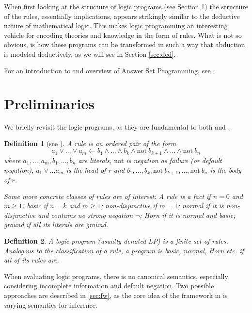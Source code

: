 \documentclass[a4paper]{article}
\newcommand{\fail}{\mathrm{not } \ \xspace}
\newcommand{\from}{\ensuremath{\leftarrow}}
\newtheorem{definition}{Definition}
\begin{document}
When first looking at the structure of logic programs (see Section \ref{sec:prelim}) the structure of the rules, essentially implications, appears strikingly similar to the deductive nature of mathematical logic. This makes logic programming an interesting vehicle for encoding theories and knowledge in the form of rules. What is not so obvious, is how these programs can be transformed in such a way that abduction is modeled deductively, as we will see in Section \ref{sec:ded}.

For an introduction to and overview of Answer Set Programming, see \cite{DBLP:conf/rweb/EiterIK09}.

\section{Preliminaries}
\label{sec:prelim}

We briefly revisit the logic programs, as they are fundamental to both \citep{DBLP:journals/logcom/ConsoleDT91} and \cite{DBLP:journals/tcs/EiterGL97}.

\begin{definition}[{see \cite[Slide 15]{ewbs}}]
	A \emph{rule} is an ordered pair of the form $$a_1 \vee \ldots \vee a_m \from b_1 \wedge \ldots \wedge b_k \wedge \fail b_{k+1} \wedge \ldots \wedge \fail b_n$$ where $a_1, \ldots, a_m, b_1, \ldots, b_n$ are literals, $\mathrm{not}$ is \emph{negation as failure} (or \emph{default negation}), $a_1 \vee \ldots a_m$ is the \emph{head} of $r$ and $b_1, \ldots, b_k, \fail b_{k+1}, \ldots, \fail b_n$ is the \emph{body} of $r$.
	
	Some more concrete classes of rules are of interest: A rule is a \emph{fact} if $n = 0$ and $m \geq 1$; \emph{basic} if $n = k$ and $m \geq 1$; \emph{non-disjunctive} if $m = 1$; \emph{normal} if it is non-disjunctive and contains no strong negation $\neg$; \emph{Horn} if it is normal and basic; \emph{ground} if all its literals are ground.
\end{definition}

\begin{definition} \label{def:lp}
	A logic program (usually denoted $LP$) is a finite set of rules. Analogous to the classification of a rule, a program is basic, normal, Horn etc. if all of its rules are.
\end{definition}

When evaluating logic programs, there is no canonical semantics, especially considering incomplete information and default negation. Two possible approaches are described in \ref{sec:fw}, as the core idea of the framework in \cite{DBLP:journals/tcs/EiterGL97} is varying semantics for inference.
\end{document}
